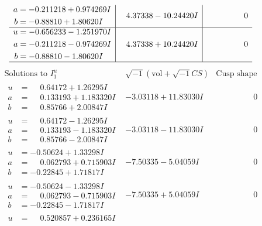 \documentclass[1p]{elsarticle_modified}
\theoremstyle{definition}
\newcommand{\I}{\sqrt{-1}}
\begin{document}
$$\begin{array}{c|c|c}
\begin{aligned}
a &= -0.211218 + 0.974269 I \\
b &= -0.88810 + 1.80620 I\end{aligned}
 & \phantom{-}4.37338 - 10.24420 I & \phantom{-0.000000 } 0 \\ \hline\begin{aligned}
u &= -0.656233 - 1.251970 I \\
a &= -0.211218 - 0.974269 I \\
b &= -0.88810 - 1.80620 I\end{aligned}
 & \phantom{-}4.37338 + 10.24420 I & \phantom{-0.000000 } 0\\
 \hline 
 \end{array}$$\newpage$$\begin{array}{c|c|c}  
\text{Solutions to }I^u_{1}& \I (\text{vol} + \sqrt{-1}CS) & \text{Cusp shape}\\
 \hline 
\begin{aligned}
u &= \phantom{-}0.64172 + 1.26295 I \\
a &= \phantom{-}0.133193 + 1.183320 I \\
b &= \phantom{-}0.85766 + 2.00847 I\end{aligned}
 & -3.03118 + 11.83030 I & \phantom{-0.000000 } 0 \\ \hline\begin{aligned}
u &= \phantom{-}0.64172 - 1.26295 I \\
a &= \phantom{-}0.133193 - 1.183320 I \\
b &= \phantom{-}0.85766 - 2.00847 I\end{aligned}
 & -3.03118 - 11.83030 I & \phantom{-0.000000 } 0 \\ \hline\begin{aligned}
u &= -0.50624 + 1.33298 I \\
a &= \phantom{-}0.062793 + 0.715903 I \\
b &= -0.22845 + 1.71817 I\end{aligned}
 & -7.50335 - 5.04059 I & \phantom{-0.000000 } 0 \\ \hline\begin{aligned}
u &= -0.50624 - 1.33298 I \\
a &= \phantom{-}0.062793 - 0.715903 I \\
b &= -0.22845 - 1.71817 I\end{aligned}
 & -7.50335 + 5.04059 I & \phantom{-0.000000 } 0 \\ \hline\begin{aligned}
u &= \phantom{-}0.520857 + 0.236165 I \\

\end{aligned}
\end{array}$$
\end{document}
